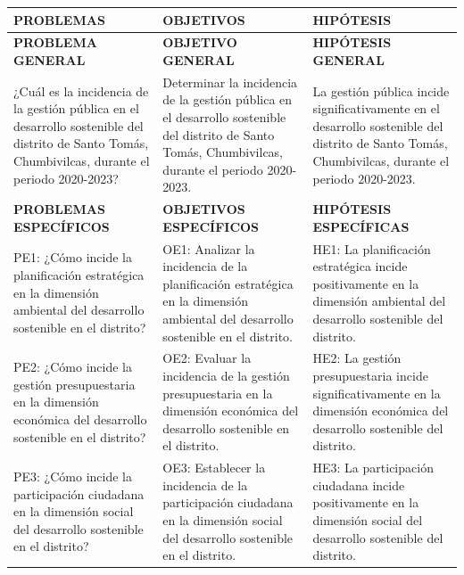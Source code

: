 \documentclass[
  man,
  floatsintext,
  longtable,
  a4paper,
  nolmodern,
  notxfonts,
  notimes,
  12pt,
  colorlinks=true,linkcolor=blue,citecolor=blue,urlcolor=blue]{apa7}
\newcounter{none} %
\begin{document}
{\def\LTcaptype{none} %
\begin{longtable}[]{@{}
  >{\raggedright\arraybackslash}p{}
  >{\raggedright\arraybackslash}p{}
  >{\raggedright\arraybackslash}p{}@{}}
\toprule\noalign{}
\begin{minipage}[b]{\linewidth}\raggedright
PROBLEMAS
\end{minipage} & \begin{minipage}[b]{\linewidth}\raggedright
OBJETIVOS
\end{minipage} & \begin{minipage}[b]{\linewidth}\raggedright
HIPÓTESIS
\end{minipage} \\
\midrule\noalign{}
\endhead
\bottomrule\noalign{}
\endlastfoot
\textbf{PROBLEMA GENERAL} & \textbf{OBJETIVO GENERAL} &
\textbf{HIPÓTESIS GENERAL} \\
¿Cuál es la incidencia de la gestión pública en el desarrollo sostenible
del distrito de Santo Tomás, Chumbivilcas, durante el periodo 2020-2023?
& Determinar la incidencia de la gestión pública en el desarrollo
sostenible del distrito de Santo Tomás, Chumbivilcas, durante el periodo
2020-2023. & La gestión pública incide significativamente en el
desarrollo sostenible del distrito de Santo Tomás, Chumbivilcas, durante
el periodo 2020-2023. \\
\textbf{PROBLEMAS ESPECÍFICOS} & \textbf{OBJETIVOS ESPECÍFICOS} &
\textbf{HIPÓTESIS ESPECÍFICAS} \\
PE1: ¿Cómo incide la planificación estratégica en la dimensión ambiental
del desarrollo sostenible en el distrito? & OE1: Analizar la incidencia
de la planificación estratégica en la dimensión ambiental del desarrollo
sostenible en el distrito. & HE1: La planificación estratégica incide
positivamente en la dimensión ambiental del desarrollo sostenible del
distrito. \\
PE2: ¿Cómo incide la gestión presupuestaria en la dimensión económica
del desarrollo sostenible en el distrito? & OE2: Evaluar la incidencia
de la gestión presupuestaria en la dimensión económica del desarrollo
sostenible en el distrito. & HE2: La gestión presupuestaria incide
significativamente en la dimensión económica del desarrollo sostenible
del distrito. \\
PE3: ¿Cómo incide la participación ciudadana en la dimensión social del
desarrollo sostenible en el distrito? & OE3: Establecer la incidencia de
la participación ciudadana en la dimensión social del desarrollo
sostenible en el distrito. & HE3: La participación ciudadana incide
positivamente en la dimensión social del desarrollo sostenible del
distrito. \\
\end{longtable}
}
\end{document}
